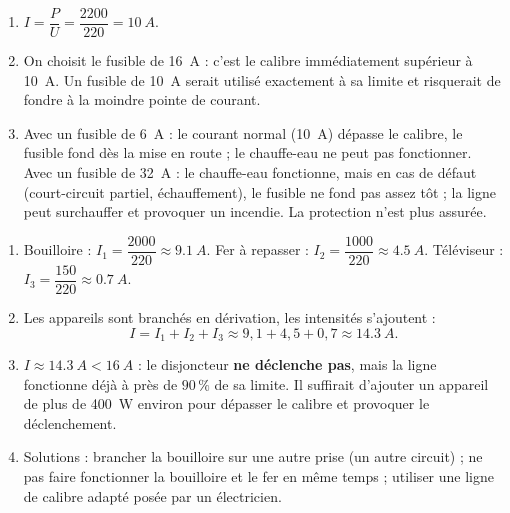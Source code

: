\documentclass[11pt]{article}
\begin{document}
\begin{corrige}
\begin{enumerate}
\item $I = \dfrac{P}{U} = \dfrac{2200}{220} = \SI{10}{A}$.
\item On choisit le fusible de \SI{16}{A} : c'est le calibre immédiatement supérieur à \SI{10}{A}. Un fusible de \SI{10}{A} serait utilisé exactement à sa limite et risquerait de fondre à la moindre pointe de courant.
\item Avec un fusible de \SI{6}{A} : le courant normal (\SI{10}{A}) dépasse le calibre, le fusible fond dès la mise en route ; le chauffe-eau ne peut pas fonctionner. Avec un fusible de \SI{32}{A} : le chauffe-eau fonctionne, mais en cas de défaut (court-circuit partiel, échauffement), le fusible ne fond pas assez tôt ; la ligne peut surchauffer et provoquer un incendie. La protection n'est plus assurée.
\end{enumerate}
\end{corrige}

\begin{corrige}
\begin{enumerate}
\item Bouilloire : $I_1 = \dfrac{2000}{220} \approx \SI{9,1}{A}$. Fer à repasser : $I_2 = \dfrac{1000}{220} \approx \SI{4,5}{A}$. Téléviseur : $I_3 = \dfrac{150}{220} \approx \SI{0,7}{A}$.
\item Les appareils sont branchés en dérivation, les intensités s'ajoutent :
\[ I = I_1 + I_2 + I_3 \approx 9,1 + 4,5 + 0,7 \approx \SI{14,3}{A}. \]
\item $I \approx \SI{14,3}{A} < \SI{16}{A}$ : le disjoncteur \textbf{ne déclenche pas}, mais la ligne fonctionne déjà à près de $90\,\%$ de sa limite. Il suffirait d'ajouter un appareil de plus de \SI{400}{W} environ pour dépasser le calibre et provoquer le déclenchement.
\item Solutions : brancher la bouilloire sur une autre prise (un autre circuit) ; ne pas faire fonctionner la bouilloire et le fer en même temps ; utiliser une ligne de calibre adapté posée par un électricien.
\end{enumerate}
\end{corrige}
\end{document}
